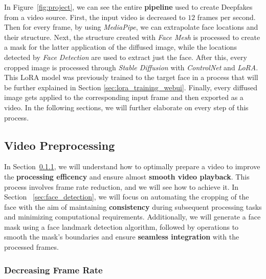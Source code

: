 \documentclass[preprint]{elsarticle}
\begin{document}
In Figure~\ref{fig:project}, we can see the entire \textbf{pipeline} used to create Deepfakes from a video source. 
First, the input video is decreased to $12$ frames per second. 
Then for every frame, by using \emph{MediaPipe}, we can extrapolate face locations and their structure. 
Next, the structure created with \emph{Face Mesh} is processed to create a mask for the latter application of the diffused image, 
while the locations detected by \emph{Face Detection} are used to extract just the face.
After this, every cropped image is processed through \emph{Stable Diffusion} with \emph{ControlNet} and \emph{LoRA}. 
This LoRA model was previously trained to the target face in a process that will be further explained in Section \ref{sec:lora_training_webui}. 
Finally, every diffused image gets applied to the corresponding input frame and then exported as a video. 
In the following sections, we will further elaborate on every step of this process. 

\subsection{Video Preprocessing} \label{sec:video_preprocessing}

In Section~\ref{sec:decreasing_frame_rate}, we will understand how to optimally prepare a video to improve the \textbf{processing efficency} and ensure almost \textbf{smooth video playback}. This process involves frame rate reduction, and we will see how to achieve it.
In Section ~\ref{sec:face_detection}, we will focus on automating the cropping of the face with the aim of maintaining \textbf{consistency} during subsequent processing tasks and minimizing computational requirements. Additionally, we will generate a face mask using a face landmark detection algorithm, followed by operations to smooth the mask's boundaries and ensure \textbf{seamless integration} with the processed frames.

\subsubsection{Decreasing Frame Rate} \label{sec:decreasing_frame_rate}
\end{document}
